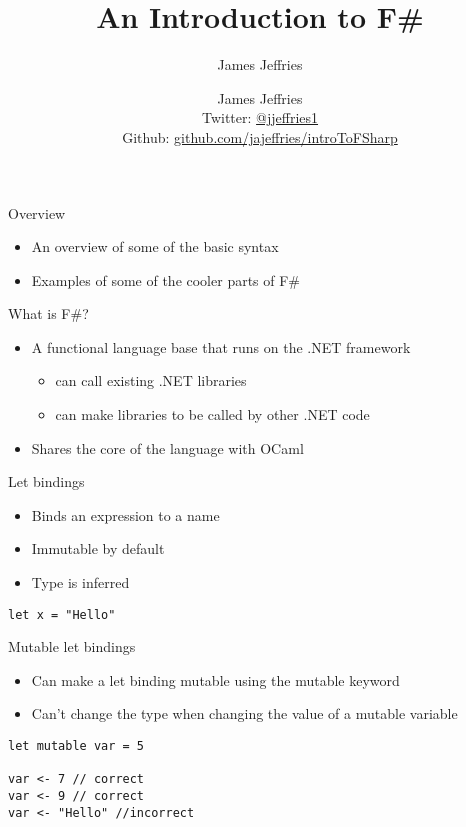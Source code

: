 \documentclass[landscape]{slides}
\author{James Jeffries}
\author{\parbox{.5\textwidth}{\centering
  James Jeffries \\
  \small Twitter: \href{http://www.twitter.com/jjeffries1}{@jjeffries1} \\[3pt]
  Github: \href{https://github.com/jajeffries/introToFSharp}{github.com/jajeffries/introToFSharp}}}
\title{An Introduction to F\#}
\begin{document}
\begin{slide}
\maketitle
\end{slide}

\begin{slide}{Overview}
\begin{itemize}
\item An overview of some of the basic syntax
\item Examples of some of the cooler parts of F\#
\end{itemize}
\end{slide}

\begin{slide}{What is F\#?}
\begin{itemize}
\item A functional language base that runs on the .NET framework
\begin{itemize}
\item can call existing .NET libraries
\item can make libraries to be called by other .NET code
\end{itemize}
\item Shares the core of the language with OCaml
\end{itemize}
\end{slide}

\begin{slide}{Let bindings}
\begin{itemize}
\item Binds an expression to a name
\item Immutable by default
\item Type is inferred
\end{itemize}
\begin{verbatim}
let x = "Hello"
\end{verbatim}
\end{slide}

\begin{slide}{Mutable let bindings}
\begin{itemize}
\item Can make a let binding mutable using the mutable keyword 
\item Can't change the type when changing the value of a mutable variable
\end{itemize}
\begin{verbatim}
let mutable var = 5 

var <- 7 // correct
var <- 9 // correct
var <- "Hello" //incorrect
\end{verbatim}
\end{slide}
\end{document}
